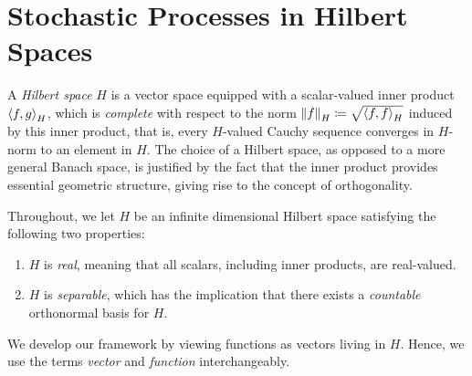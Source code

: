 \section{Stochastic Processes in Hilbert Spaces}

A \textit{Hilbert space} \(H\) is a vector space equipped with a scalar-valued inner product \(\ev{f, g}_{H}\), which is \textit{complete} with respect to the norm \(\norm{f}_{H} \coloneqq \sqrt{\ev{f, f}_{H}}\) induced by this inner product, that is, every \(H\)-valued Cauchy sequence converges in \(H\)-norm to an element in \(H\). The choice of a Hilbert space, as opposed to a more general Banach space, is justified by the fact that the inner product provides essential geometric structure, giving rise to the concept of orthogonality.

Throughout, we let \(H\) be an infinite dimensional Hilbert space satisfying the following two properties:
\begin{enumerate}
  \item \(H\) is \textit{real}, meaning that all scalars, including inner products, are real-valued.
  \item \(H\) is \textit{separable}, which has the implication that there exists a \textit{countable} orthonormal basis for \(H\).
\end{enumerate}

We develop our framework by viewing functions as vectors living in \(H\). Hence, we use the terms \textit{vector} and \textit{function} interchangeably.

